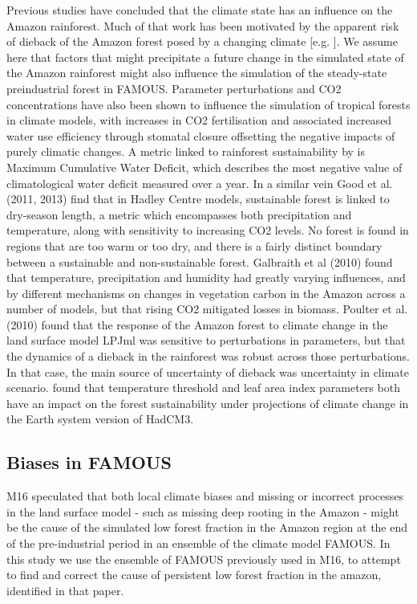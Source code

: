\documentclass[gmd, manuscript]{copernicus}
\begin{document}
Previous studies have concluded that the climate state has an influence on the Amazon rainforest. Much of that work has been motivated by the apparent risk of dieback of the Amazon forest posed by a changing climate [e.g. \cite{malhi2008climate, cox2004amazonian}].  We assume here that factors that might precipitate a future change in the simulated state of the Amazon rainforest might also influence the simulation of the steady-state preindustrial forest in FAMOUS. Parameter perturbations and CO2 concentrations have also been shown to influence the simulation of tropical forests in climate models, with increases in CO2 fertilisation and associated increased water use efficiency through stomatal closure offsetting the negative impacts of purely climatic changes. A metric linked to rainforest sustainability by \cite{malhi2009exploring} is Maximum Cumulative Water Deficit, which describes the most negative value of climatological water deficit measured over a year. In a similar vein Good et al. (2011, 2013) find that in Hadley Centre models, sustainable forest is linked to dry-season length, a metric which encompasses both precipitation and temperature, along with sensitivity to increasing CO2 levels. No forest is found in regions that are too warm or too dry, and there is a fairly distinct boundary between a sustainable and non-sustainable forest. Galbraith et al (2010) found that temperature, precipitation and humidity had greatly varying influences, and by different mechanisms on changes in vegetation carbon in the Amazon across a number of models, but that rising CO2 mitigated losses in biomass. Poulter et al. (2010) found that the response of the Amazon forest to climate change in the land surface model LPJml was sensitive to perturbations in parameters, but that the dynamics of a dieback in the rainforest was robust across those perturbations. In that case, the main source of uncertainty of dieback was uncertainty in climate scenario. \cite{boulton2017exploring} found that temperature threshold and leaf area index parameters both have an impact on the forest sustainability under projections of climate change in the Earth system version of HadCM3.

\subsection{Biases in FAMOUS}

M16 speculated that both local climate biases and missing or incorrect processes in the land surface model - such as missing deep rooting in the Amazon - might be the cause of the simulated low forest fraction in the Amazon region at the end of the pre-industrial period in an ensemble of the climate model FAMOUS. In this study we use the ensemble of FAMOUS previously used in M16, to attempt to find and correct the cause of persistent low forest fraction in the amazon, identified in that paper. 
\end{document}
